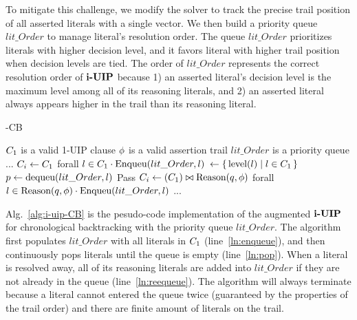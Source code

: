 To mitigate this challenge, we modify the solver to track the precise trail position of all asserted literals with a single vector. We then build a priority queue $lit\_Order$ to manage literal's resolution order. The queue $lit\_Order$  prioritizes literals with higher decision level, and it favors literal with higher trail position when decision levels are tied. The order of $lit\_Order$  represents the correct resolution order of $\textbf{i-UIP}$ because 1) an asserted literal's decision level is the maximum level among all of its reasoning literals, and 2) an asserted literal always appears higher in the trail than its reasoning literal.  

\begin{algorithm}[t]
\caption{\IUIP-CB}\label{alg:i-uip-CB}
\begin{algorithmic}[1]
\Require  $C_{1}$ is a valid 1-UIP clause
\Require  $\phi$ is a valid assertion trail
\Require  $lit\_Order$ is a priority queue
    \State ...
    \State $C_{i} \gets C_{1} $ 
    \State forall $l \in C_{1} \cdot \text{Enqueu}(lit\_Order, l)$  \label{ln:enqueue}
    \State {} $\gets \{\,\text{level}(l)\mid l \in C_{1}\,\}$
     \label{ln:pop}
        \State $p \gets \text{dequeu}(lit\_Order, l) $ \label{ln:dequeue}
         \label{ln:resolvable}
          \State Pass
        \Else 
            \State  $C_{i} \gets (C_{1} ) \bowtie \text{Reason}(q, \phi)$
            \State   forall $l \in \text{Reason}(q, \phi) \cdot \text{Enqueu}(lit\_Order, l)$ \label{ln:reequeue}
        \EndIf
    \EndWhile
\State ...
\EndProcedure
\end{algorithmic}
\end{algorithm}

Alg.~\ref{alg:i-uip-CB} is the pesudo-code implementation of the augmented $\textbf{i-UIP}$ for chronological backtracking with the priority queue $lit\_Order$. The algorithm first populates $lit\_Order$ with all literals in $C_{1}$ (line~\ref{ln:enqueue}), and then continuously pops literals until the queue is empty (line~\ref{ln:pop}). When a literal is resolved away, all of its reasoning literals are added into $lit\_Order$ if they are not already in the queue (line~\ref{ln:reequeue}). The algorithm will always terminate because a literal cannot entered the queue twice (guaranteed by the properties of the trail order) and there are finite amount of literals on the trail.